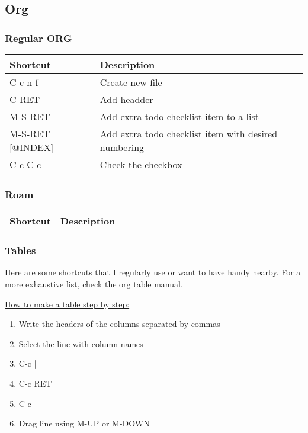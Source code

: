 \documentclass[11pt]{article}
\begin{document}
\subsection{Org}
\label{sec:org86d308a}
\subsubsection{Regular ORG}
\label{sec:orgc102f51}
\begin{center}
\begin{tabular}{ll}
\hline
Shortcut & Description\\
\hline
C-c n f & Create new file\\
C-RET & Add headder\\
M-S-RET & Add extra todo checklist item to a list\\
M-S-RET [@INDEX] & Add extra todo checklist item with desired numbering\\
C-c C-c & Check the checkbox\\
\hline
\end{tabular}
\end{center}
\subsubsection{Roam}
\label{sec:org0390aef}
\begin{center}
\begin{tabular}{ll}
\hline
Shortcut & Description\\
\hline
\hline
\end{tabular}
\end{center}
\subsubsection{Tables}
\label{sec:orgcfe5207}
Here are some shortcuts that I regularly use or want to have handy nearby.  For a more exhaustive list, check \href{https://orgmode.org/manual/Built\_002din-Table-Editor.html\#Built\_002din-Table-Editor}{the org table manual}.

\uline{How to make a table step by step:}
\begin{enumerate}
\item Write the headers of the columns separated by commas
\item Select the line with column names
\item C-c |
\item C-c RET
\item C-c -
\item Drag line using M-UP or M-DOWN
\end{enumerate}
\end{document}
